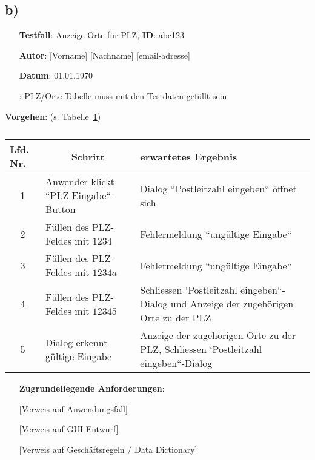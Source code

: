 \subsection*{b)}

\begin{itemize}
    \item[] \textbf{Testfall}: Anzeige Orte für PLZ, \textbf{ID}: abc123
    \item[] \textbf{Autor}: [Vorname] [Nachname] [email-adresse]
    \item[] \textbf{Datum}: 01.01.1970
    \item[] : PLZ/Orte-Tabelle muss mit den Testdaten gefüllt sein
\end{itemize}

\textbf{Vorgehen}: (s. Tabelle~\ref{tab:testfall})

\begin{table}[]
    \centering
    \setlength{\tabcolsep}{0.5em}
    \def\arraystretch{1.5}
    \begin{tabular}{|c|p{6cm}|p{6cm}|}
        \hline
        \multicolumn{1}{|l|}{\textbf{Lfd. Nr.}} & \multicolumn{1}{c|}{\textbf{Schritt}}        & \textbf{erwartetes Ergebnis}                        \\ \hline
        1 & Anwender klickt ``PLZ Eingabe``-Button & Dialog ``Postleitzahl eingeben`` öffnet sich\\ \hline
        2 & Füllen des PLZ-Feldes mit $1234$ & Fehlermeldung ``ungültige Eingabe``\\ \hline
        3 & Füllen des PLZ-Feldes mit $1234a$ & Fehlermeldung ``ungültige Eingabe``\\ \hline
        4 & Füllen des PLZ-Feldes mit $12345$ & Schliessen `Postleitzahl eingeben``-Dialog und Anzeige der zugehörigen Orte zu der PLZ\\ \hline
        5 & Dialog erkennt gültige Eingabe &  Anzeige der zugehörigen Orte zu der PLZ, Schliessen `Postleitzahl eingeben``-Dialog\\ \hline
    \end{tabular}
    \caption[]{}
    \label{tab:testfall}
\end{table}

\noindent

\begin{itemize}
    \item[]  \textbf{Zugrundeliegende Anforderungen}:
    \item[] [Verweis auf Anwendungsfall]
    \item[] [Verweis auf GUI-Entwurf]
    \item[] [Verweis auf Geschäftsregeln / Data Dictionary]
\end{itemize}